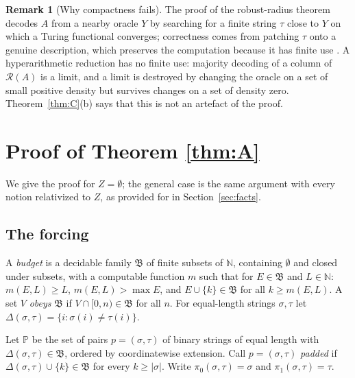 \documentclass[11pt,letterpaper]{article}
\theoremstyle{definition}
\newtheorem{remark}[definition]{Remark}
\numberwithin{equation}{section}
\newcommand{\N}{\mathbb N}
\newcommand{\Rc}{\mathcal R}
\newcommand{\bud}{\mathfrak B}
\newcommand{\PP}{\mathbb P}
\begin{document}
\begin{remark}[Why compactness fails]\label{rem:finiteuse}
The proof of the robust-radius theorem decodes $A$ from a nearby oracle $Y$ by searching for a finite string $\tau$ close to $Y$ on which a Turing functional converges; correctness comes from patching $\tau$ onto a genuine description, which preserves the computation because it has finite use \cite[Lemma~4.3]{Synthesis}. A hyperarithmetic reduction has no finite use: majority decoding of a column of $\Rc(A)$ is a limit, and a limit is destroyed by changing the oracle on a set of small positive density but survives changes on a set of density zero. Theorem~\ref{thm:C}(b) says that this is not an artefact of the proof.
\end{remark}

\section{Proof of Theorem \ref{thm:A}}\label{sec:A}
We give the proof for $Z=\emptyset$; the general case is the same argument with every notion relativized to $Z$, as provided for in Section~\ref{sec:facts}.

\subsection{The forcing}
A \emph{budget} is a decidable family $\bud$ of finite subsets of $\N$, containing $\emptyset$ and closed under subsets, with a computable function $m$ such that for $E\in\bud$ and $L\in\N$: $m(E,L)\ge L$, $m(E,L)>\max E$, and $E\cup\{k\}\in\bud$ for all $k\ge m(E,L)$. A set $V$ \emph{obeys} $\bud$ if $V\cap[0,n)\in\bud$ for all $n$. For equal-length strings $\sigma,\tau$ let $\Delta(\sigma,\tau)=\{i:\sigma(i)\ne\tau(i)\}$.

Let $\PP$ be the set of pairs $p=(\sigma,\tau)$ of binary strings of equal length with $\Delta(\sigma,\tau)\in\bud$, ordered by coordinatewise extension. Call $p=(\sigma,\tau)$ \emph{padded} if $\Delta(\sigma,\tau)\cup\{k\}\in\bud$ for every $k\ge|\sigma|$. Write $\pi_0(\sigma,\tau)=\sigma$ and $\pi_1(\sigma,\tau)=\tau$.
\end{document}
